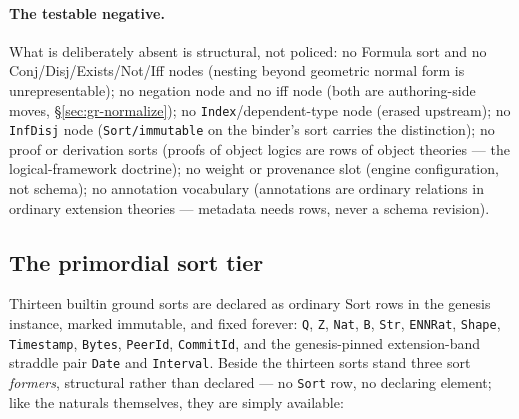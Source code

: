 \paragraph{The testable negative.} What is deliberately absent is
structural, not policed: no Formula sort and no
Conj/Disj/Exists/Not/Iff nodes (nesting beyond geometric normal form
is unrepresentable); no negation node and no iff node (both are
authoring-side moves, \S\ref{sec:gr-normalize}); no
\texttt{Index}/dependent-type node (erased upstream); no
\texttt{InfDisj} node (\texttt{Sort/immutable} on the binder's sort
carries the distinction); no proof or derivation sorts (proofs of
object logics are rows of object theories — the logical-framework
doctrine); no weight or provenance slot (engine configuration, not
schema); no annotation vocabulary (annotations are ordinary relations
in ordinary extension theories — metadata needs rows, never a schema
revision).

\subsection{The primordial sort tier}
\label{sec:gr-meta-tier}

Thirteen builtin ground sorts are declared as ordinary Sort rows in
the genesis instance, marked immutable, and fixed forever:
\texttt{Q}, \texttt{Z}, \texttt{Nat}, \texttt{B}, \texttt{Str},
\texttt{ENNRat}, \texttt{Shape}, \texttt{Timestamp}, \texttt{Bytes},
\texttt{PeerId}, \texttt{CommitId}, and the genesis-pinned
extension-band straddle pair \texttt{Date} and \texttt{Interval}.
Beside the thirteen sorts stand three sort \emph{formers}, structural
rather than declared — no \texttt{Sort} row, no declaring element;
like the naturals themselves, they are simply available:

